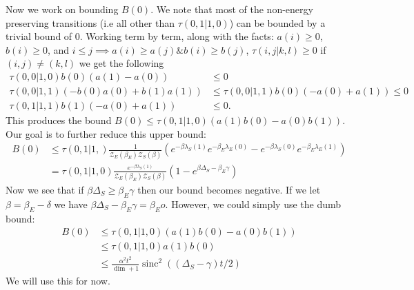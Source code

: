 \documentclass{article}
\newcommand{\parens}[1]{\left( #1 \right)}
\newcommand{\partfun}{\mathcal{Z}}
\DeclareMathOperator{\sinc}{sinc}
\begin{document}
Now we work on bounding $B(0)$. We note that most of the non-energy preserving transitions (i.e all other than $\tau(0,1|1,0)$) can be bounded by a trivial bound of 0. Working term by term, along with the facts: $a(i) \geq 0$, $b(i) \geq 0$, and $i \leq j \implies a(i) \geq a(j) \& b(i) \geq b(j)$, $\tau(i,j|k,l) \geq 0$ if $(i,j) \neq (k,l)$ we get the following
\begin{align}
    \tau(0,0|1,0) b(0)(a(1) - a(0)) &\leq 0 \\
    \tau(0,0|1,1) (-b(0) a(0) + b(1) a(1)) &\leq \tau(0,0|1,1) b(0) (-a(0) + a(1)) \leq 0 \\
    \tau(0,1|1,1) b(1) (-a(0) + a(1)) &\leq 0.
\end{align}
This produces the bound $B(0) \leq \tau(0,1|1,0) (a(1)b(0) - a(0)b(1))$. Our goal is to further reduce this upper bound:
\begin{align}
    B(0) &\leq \tau(0,1|1,) \frac{1}{\partfun_E(\beta_E) \partfun_S(\beta)}\parens{e^{-\beta \lambda_S(1)} e^{-\beta_E \lambda_E(0)} - e^{-\beta \lambda_S(0)} e^{-\beta_E \lambda_E(1)}} \\
    &= \tau(0,1|1,0) \frac{e^{-\beta \lambda_S(1)}}{\partfun_E(\beta_E) \partfun_S(\beta)} (1 - e^{\beta \Delta_S - \beta_E \gamma })
\end{align}
Now we see that if $\beta \Delta_S \geq \beta_E \gamma$ then our bound becomes negative. If we let $\beta = \beta_E - \delta$ we have $\beta \Delta_S - \beta_E \gamma = \beta_E o$.
However, we could simply use the dumb bound:
\begin{align}
    B(0) &\leq \tau(0,1|1,0) (a(1) b(0) - a(0) b(1)) \\
    &\leq \tau(0,1|1,0) a(1) b(0) \\
    &\leq \frac{\alpha^2 t^2}{\dim + 1} \sinc^2((\Delta_S -\gamma)t/2)
\end{align}
We will use this for now.
\end{document}
